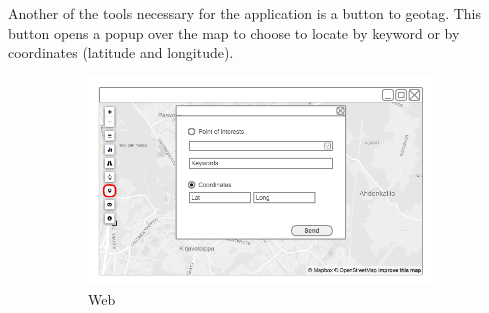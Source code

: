 
Another of the tools necessary for the application is a button to geotag. This button opens a popup over the map to choose to locate by keyword or by coordinates (latitude and longitude).

\begin{figure}[ht]
  \centering
  \begin{subfigure}[b]{0.6\textwidth}
    \includegraphics[width=\textwidth]
      {img/c02-application/png/web-basemap-focus.png}
    \caption{Web}
  \end{subfigure}
  ~
  \begin{subfigure}[b]{0.2\textwidth}

\end{subfigure}
\end{figure}
